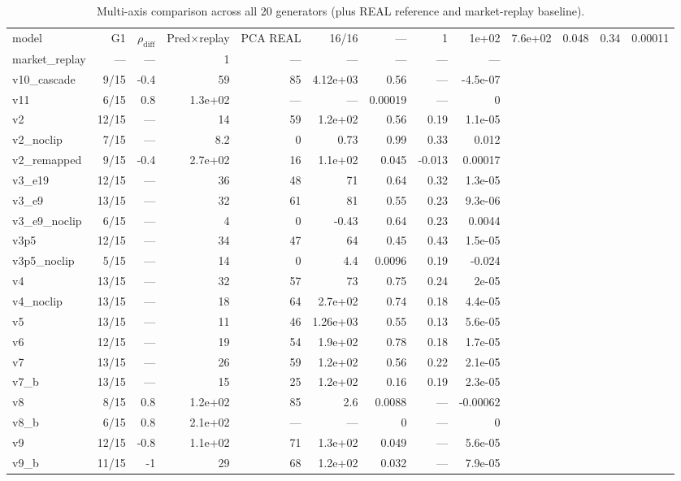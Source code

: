 \begin{table}
\caption{Multi-axis comparison across all 20 generators (plus REAL reference and market-replay baseline).}
\label{tab:multi_axis}
\begin{tabular}{lrrrrrrrr}
\toprule
model & G1 & \(\rho_\mathrm{diff}\) & Pred×replay & PCA%
\midrule
REAL & 16/16 & — & 1 & 1e+02 & 7.6e+02 & 0.048 & 0.34 & 0.00011 \\
market_replay & — & — & 1 & — & — & — & — & — \\
v10_cascade & 9/15 & -0.4 & 59 & 85 & 4.12e+03 & 0.56 & — & -4.5e-07 \\
v11 & 6/15 & 0.8 & 1.3e+02 & — & — & 0.00019 & — & 0 \\
v2 & 12/15 & — & 14 & 59 & 1.2e+02 & 0.56 & 0.19 & 1.1e-05 \\
v2_noclip & 7/15 & — & 8.2 & 0 & 0.73 & 0.99 & 0.33 & 0.012 \\
v2_remapped & 9/15 & -0.4 & 2.7e+02 & 16 & 1.1e+02 & 0.045 & -0.013 & 0.00017 \\
v3_e19 & 12/15 & — & 36 & 48 & 71 & 0.64 & 0.32 & 1.3e-05 \\
v3_e9 & 13/15 & — & 32 & 61 & 81 & 0.55 & 0.23 & 9.3e-06 \\
v3_e9_noclip & 6/15 & — & 4 & 0 & -0.43 & 0.64 & 0.23 & 0.0044 \\
v3p5 & 12/15 & — & 34 & 47 & 64 & 0.45 & 0.43 & 1.5e-05 \\
v3p5_noclip & 5/15 & — & 14 & 0 & 4.4 & 0.0096 & 0.19 & -0.024 \\
v4 & 13/15 & — & 32 & 57 & 73 & 0.75 & 0.24 & 2e-05 \\
v4_noclip & 13/15 & — & 18 & 64 & 2.7e+02 & 0.74 & 0.18 & 4.4e-05 \\
v5 & 13/15 & — & 11 & 46 & 1.26e+03 & 0.55 & 0.13 & 5.6e-05 \\
v6 & 12/15 & — & 19 & 54 & 1.9e+02 & 0.78 & 0.18 & 1.7e-05 \\
v7 & 13/15 & — & 26 & 59 & 1.2e+02 & 0.56 & 0.22 & 2.1e-05 \\
v7_b & 13/15 & — & 15 & 25 & 1.2e+02 & 0.16 & 0.19 & 2.3e-05 \\
v8 & 8/15 & 0.8 & 1.2e+02 & 85 & 2.6 & 0.0088 & — & -0.00062 \\
v8_b & 6/15 & 0.8 & 2.1e+02 & — & — & 0 & — & 0 \\
v9 & 12/15 & -0.8 & 1.1e+02 & 71 & 1.3e+02 & 0.049 & — & 5.6e-05 \\
v9_b & 11/15 & -1 & 29 & 68 & 1.2e+02 & 0.032 & — & 7.9e-05 \\
\bottomrule
\end{tabular}
\end{table}
